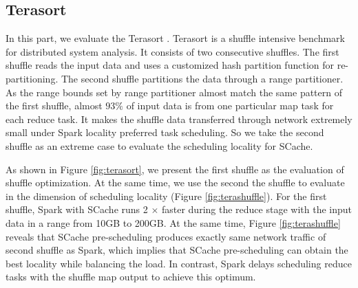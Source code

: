 
\subsection{Terasort}
In this part, we evaluate the Terasort \cite{spark-tera}.
Terasort \cite{spark-tera} is a shuffle intensive benchmark for distributed system analysis. It consists of two consecutive shuffles. The first shuffle reads the input data and uses a customized hash partition function for re-partitioning. The second shuffle partitions the data through a range partitioner. As the range bounds set by range partitioner almost match the same pattern of the first shuffle, almost $93\%$ of input data is from one particular map task for each reduce task. It makes the shuffle data transferred through network extremely small under Spark locality preferred task scheduling. So we take the second shuffle as an extreme case to evaluate the scheduling locality for SCache.

As shown in Figure \ref{fig:terasort}, we present the first shuffle as the evaluation of shuffle optimization. At the same time, we use the second the shuffle to evaluate in the dimension of scheduling locality (Figure \ref{fig:terashuffle}). For the first shuffle, Spark with SCache runs 2 $\times$ faster during the reduce stage with the input data in a range from 10GB to 200GB. At the same time, Figure \ref{fig:terashuffle} reveals that SCache pre-scheduling produces exactly same network traffic of second shuffle as Spark, which implies that SCache pre-scheduling can obtain the best locality while balancing the load. In contrast, Spark delays scheduling reduce tasks with the shuffle map output to achieve this optimum.

